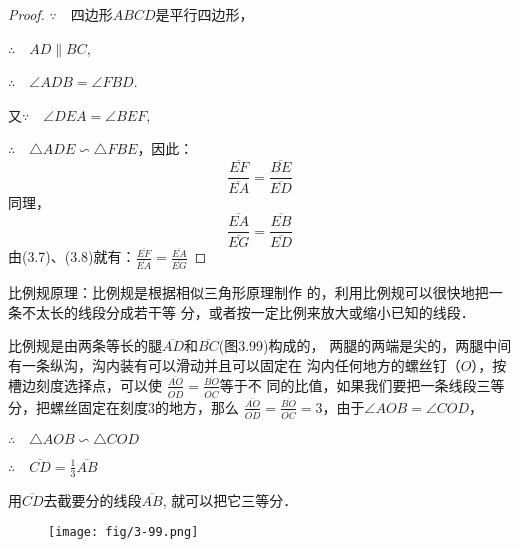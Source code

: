 \begin{proof}
$\because\quad $四边形$ABCD$是平行四边形，

$\therefore\quad AD\parallel BC$,

$\therefore\quad \angle ADB=\angle FBD$.

又$\because\quad \angle DEA=\angle BEF$,

$\therefore\quad \triangle ADE\backsim \triangle FBE$，因此：
\begin{equation}
    \frac{\overline{EF}}{\overline{EA}}=\frac{\overline{BE}}{\overline{ED}}
\end{equation}
同理，
\begin{equation}
    \frac{\overline{EA}}{\overline{EG}}=\frac{\overline{EB}}{\overline{ED}}
\end{equation}
由(3.7)、(3.8)就有：$\frac{\overline{EF}}{\overline{EA}}=\frac{\overline{EA}}{\overline{EG}}$
\end{proof}

\begin{example}
    比例规原理：比例规是根据相似三角形原理制作
的，利用比例规可以很快地把一条不太长的线段分成若干等
分，或者按一定比例来放大或缩小已知的线段．

比例规是由两条等长的腿$\overline{AD}$和$\overline{BC}$(图3.99)构成的，
两腿的两端是尖的，两腿中间有一条纵沟，沟内装有可以滑动并且可以固定在
沟内任何地方的螺丝钉（$O$），按槽边刻度选择点，可以使
$\frac{\overline{AO}}{\overline{OD}}=\frac{\overline{BO}}{\overline{OC}}$等于不
同的比值，如果我们要把一条线段三等
分，把螺丝固定在刻度3的地方，那么
$\frac{\overline{AO}}{\overline{OD}}=\frac{\overline{BO}}{\overline{OC}}=3$，由于$\angle AOB=\angle COD$，

$\therefore\quad \triangle AOB\backsim \triangle COD$

$\therefore\quad \overline{CD}=\frac{1}{3}\overline{AB}$

用$\overline{CD}$去截要分的线段$\overline{AB}$, 就可以把它三等分．
\end{example}

\begin{figure}[htp]\centering
    \begin{minipage}[t]{0.38\textwidth}
    \centering
\texttt{[image: fig/3-99.png]}
    \caption{}
    \end{minipage}
    \begin{minipage}[t]{0.58\textwidth}
    \centering
    \caption{}
    \end{minipage}
    \end{figure}

